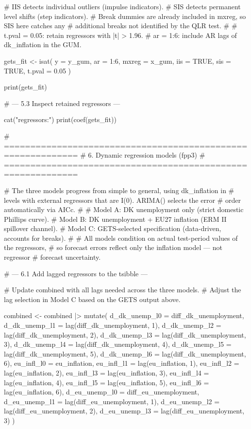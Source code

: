 # IIS detects individual outliers (impulse indicators).
# SIS detects permanent level shifts (step indicators).
# Break dummies are already included in mxreg, so SIS here catches any
# additional breaks not identified by the QLR test.
#
# t.pval = 0.05: retain regressors with |t| > 1.96.
# ar = 1:6: include AR lags of dk_inflation in the GUM.

gets_fit <- isat(
  y      = y_gum,
  ar     = 1:6,
  mxreg  = x_gum,
  iis    = TRUE,
  sis    = TRUE,
  t.pval = 0.05
)

print(gets_fit)


# --- 5.3 Inspect retained regressors ---

cat("\nRetained regressors:\n")
print(coef(gets_fit))


# ============================================================
# 6. Dynamic regression models (fpp3)
# ============================================================

# The three models progress from simple to general, using dk_inflation in
# levels with external regressors that are I(0). ARIMA() selects the error
# order automatically via AICc.
#
# Model A: DK unemployment only (strict domestic Phillips curve).
# Model B: DK unemployment + EU27 inflation (ERM II spillover channel).
# Model C: GETS-selected specification (data-driven, accounts for breaks).
#
# All models condition on actual test-period values of the regressors,
# so forecast errors reflect only the inflation model — not regressor
# forecast uncertainty.


# --- 6.1 Add lagged regressors to the tsibble ---

# Update combined with all lags needed across the three models.
# Adjust the lag selection in Model C based on the GETS output above.

combined <- combined |>
  mutate(
    d_dk_unemp_l0 = diff_dk_unemployment,
    d_dk_unemp_l1 = lag(diff_dk_unemployment, 1),
    d_dk_unemp_l2 = lag(diff_dk_unemployment, 2),
    d_dk_unemp_l3 = lag(diff_dk_unemployment, 3),
    d_dk_unemp_l4 = lag(diff_dk_unemployment, 4),
    d_dk_unemp_l5 = lag(diff_dk_unemployment, 5),
    d_dk_unemp_l6 = lag(diff_dk_unemployment, 6),
    eu_infl_l0    = eu_inflation,
    eu_infl_l1    = lag(eu_inflation, 1),
    eu_infl_l2    = lag(eu_inflation, 2),
    eu_infl_l3    = lag(eu_inflation, 3),
    eu_infl_l4    = lag(eu_inflation, 4),
    eu_infl_l5    = lag(eu_inflation, 5),
    eu_infl_l6    = lag(eu_inflation, 6),
    d_eu_unemp_l0 = diff_eu_unemployment,
    d_eu_unemp_l1 = lag(diff_eu_unemployment, 1),
    d_eu_unemp_l2 = lag(diff_eu_unemployment, 2),
    d_eu_unemp_l3 = lag(diff_eu_unemployment, 3)
  )

